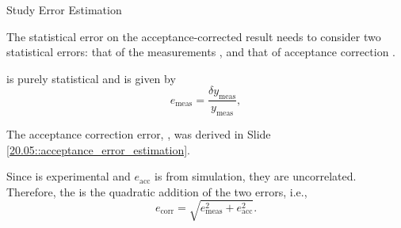 \begin{frame}{Study Error Estimation}
    \label{20.09::study_error_estimation}

    The statistical error on the acceptance-corrected result  needs to consider two statistical errors: that of the measurements , and that of acceptance correction .

    \vspace{9pt}

     is purely statistical and is given by
    \begin{equation*}
        e_\text{meas} = \frac{\delta y_\text{meas}}{y_\text{meas}},
    \end{equation*}

    \vspace{9pt}

    The acceptance correction error, , was derived in Slide \textcolor{efd_purple}{\ref{20.05::acceptance_error_estimation}}.

    \vspace{9pt}

    Since  is experimental and $e_\text{acc}$ is from simulation, they are uncorrelated.
    Therefore, the  is the quadratic addition of the two errors, i.e.,
    \begin{equation*}
        e_\text{corr} = \sqrt{e_\text{meas}^2 + e_\text{acc}^2}.
    \end{equation*}

\end{frame}

